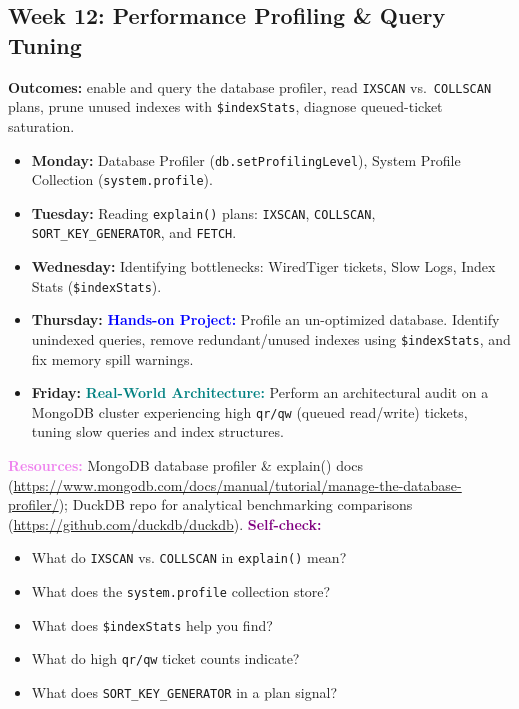 \documentclass[11pt, a4paper]{article}
\newcommand{\project}[1]{\textbf{\textcolor{blue}{Hands-on Project:}} #1}
\newcommand{\usecase}[1]{\textbf{\textcolor{teal}{Real-World Architecture:}} #1}
\newcommand{\dayitem}[2]{\item \textbf{#1:} #2}
\newcommand{\selfcheck}[1]{\vspace{1mm}\noindent\textbf{\textcolor{purple}{Self-check:}} #1}
\newcommand{\resources}[1]{\vspace{1mm}\noindent\textbf{\textcolor{violet}{Resources:}} #1}
\begin{document}
\subsection*{Week 12: Performance Profiling \& Query Tuning}
\par\noindent\textbf{Outcomes:} enable and query the database profiler, read \texttt{IXSCAN} vs.\ \texttt{COLLSCAN} plans, prune unused indexes with \texttt{\$indexStats}, diagnose queued-ticket saturation.
\begin{itemize}[label=-]
    \dayitem{Monday}{Database Profiler (\texttt{db.setProfilingLevel}), System Profile Collection (\texttt{system.profile}).}
    \dayitem{Tuesday}{Reading \texttt{explain()} plans: \texttt{IXSCAN}, \texttt{COLLSCAN}, \texttt{SORT\_KEY\_GENERATOR}, and \texttt{FETCH}.}
    \dayitem{Wednesday}{Identifying bottlenecks: WiredTiger tickets, Slow Logs, Index Stats (\texttt{\$indexStats}).}
    \dayitem{Thursday}{\project{Profile an un-optimized database. Identify unindexed queries, remove redundant/unused indexes using \texttt{\$indexStats}, and fix memory spill warnings.}}
    \dayitem{Friday}{\usecase{Perform an architectural audit on a MongoDB cluster experiencing high \texttt{qr/qw} (queued read/write) tickets, tuning slow queries and index structures.}}
\end{itemize}
\resources{MongoDB database profiler \& explain() docs (\url{https://www.mongodb.com/docs/manual/tutorial/manage-the-database-profiler/}); DuckDB repo for analytical benchmarking comparisons (\url{https://github.com/duckdb/duckdb}).}
\selfcheck{\begin{itemize}[label=-, itemsep=0pt, leftmargin=1.5em]
    \item What do \texttt{IXSCAN} vs. \texttt{COLLSCAN} in \texttt{explain()} mean?
    \item What does the \texttt{system.profile} collection store?
    \item What does \texttt{\$indexStats} help you find?
    \item What do high \texttt{qr/qw} ticket counts indicate?
    \item What does \texttt{SORT\_KEY\_GENERATOR} in a plan signal?
\end{itemize}}
\end{document}
